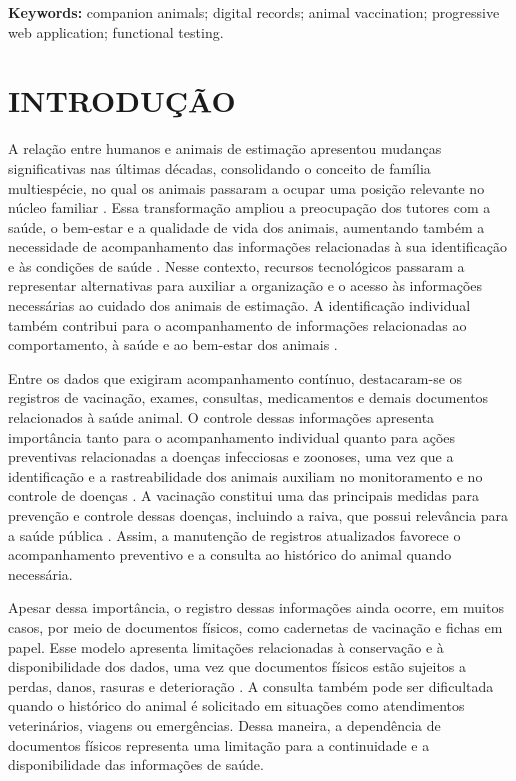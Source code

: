 \documentclass{UNESC}
\begin{document}
\vspace{0.5em}
\noindent
\textbf{Keywords:} companion animals; digital records; animal vaccination; progressive web application; functional testing.

\section{INTRODUÇÃO}

A relação entre humanos e animais de estimação apresentou mudanças significativas nas últimas décadas, consolidando o conceito de família multiespécie, no qual os animais passaram a ocupar uma posição relevante no núcleo familiar \cite{BOLSON2022}. Essa transformação ampliou a preocupação dos tutores com a saúde, o bem-estar e a qualidade de vida dos animais, aumentando também a necessidade de acompanhamento das informações relacionadas à sua identificação e às condições de saúde \cite{MORAES2024}. Nesse contexto, recursos tecnológicos passaram a representar alternativas para auxiliar a organização e o acesso às informações necessárias ao cuidado dos animais de estimação. A identificação individual também contribui para o acompanhamento de informações relacionadas ao comportamento, à saúde e ao bem-estar dos animais \cite{vidal2021}.

Entre os dados que exigiram acompanhamento contínuo, destacaram-se os registros de vacinação, exames, consultas, medicamentos e demais documentos relacionados à saúde animal. O controle dessas informações apresenta importância tanto para o acompanhamento individual quanto para ações preventivas relacionadas a doenças infecciosas e zoonoses, uma vez que a identificação e a rastreabilidade dos animais auxiliam no monitoramento e no controle de doenças \cite{murphy2008}. A vacinação constitui uma das principais medidas para prevenção e controle dessas doenças, incluindo a raiva, que possui relevância para a saúde pública \cite{MOUTINHO2017}. Assim, a manutenção de registros atualizados favorece o acompanhamento preventivo e a consulta ao histórico do animal quando necessária.

Apesar dessa importância, o registro dessas informações ainda ocorre, em muitos casos, por meio de documentos físicos, como cadernetas de vacinação e fichas em papel. Esse modelo apresenta limitações relacionadas à conservação e à disponibilidade dos dados, uma vez que documentos físicos estão sujeitos a perdas, danos, rasuras e deterioração \cite{BOLSON2022}. A consulta também pode ser dificultada quando o histórico do animal é solicitado em situações como atendimentos veterinários, viagens ou emergências. Dessa maneira, a dependência de documentos físicos representa uma limitação para a continuidade e a disponibilidade das informações de saúde.
\end{document}
